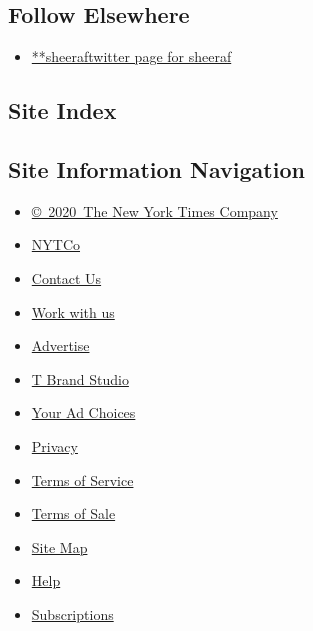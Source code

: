 \hypertarget{follow-elsewhere}{%
\subsection{Follow Elsewhere}\label{follow-elsewhere}}

\begin{itemize}
\tightlist
\item
  \href{https://twitter.com/sheeraf}{**sheeraftwitter page for sheeraf}
\end{itemize}

\hypertarget{site-index}{%
\subsection{Site Index}\label{site-index}}

\hypertarget{site-information-navigation}{%
\subsection{Site Information
Navigation}\label{site-information-navigation}}

\begin{itemize}
\tightlist
\item
  \href{https://help.nytimes3xbfgragh.onion/hc/en-us/articles/115014792127-Copyright-notice}{©~2020~The
  New York Times Company}
\end{itemize}

\begin{itemize}
\tightlist
\item
  \href{https://www.nytco.com/}{NYTCo}
\item
  \href{https://help.nytimes3xbfgragh.onion/hc/en-us/articles/115015385887-Contact-Us}{Contact
  Us}
\item
  \href{https://www.nytco.com/careers/}{Work with us}
\item
  \href{https://nytmediakit.com/}{Advertise}
\item
  \href{http://www.tbrandstudio.com/}{T Brand Studio}
\item
  \href{https://www.nytimes3xbfgragh.onion/privacy/cookie-policy\#how-do-i-manage-trackers}{Your
  Ad Choices}
\item
  \href{https://www.nytimes3xbfgragh.onion/privacy}{Privacy}
\item
  \href{https://help.nytimes3xbfgragh.onion/hc/en-us/articles/115014893428-Terms-of-service}{Terms
  of Service}
\item
  \href{https://help.nytimes3xbfgragh.onion/hc/en-us/articles/115014893968-Terms-of-sale}{Terms
  of Sale}
\item
  \href{https://spiderbites.nytimes3xbfgragh.onion}{Site Map}
\item
  \href{https://help.nytimes3xbfgragh.onion/hc/en-us}{Help}
\item
  \href{https://www.nytimes3xbfgragh.onion/subscription?campaignId=37WXW}{Subscriptions}
\end{itemize}
